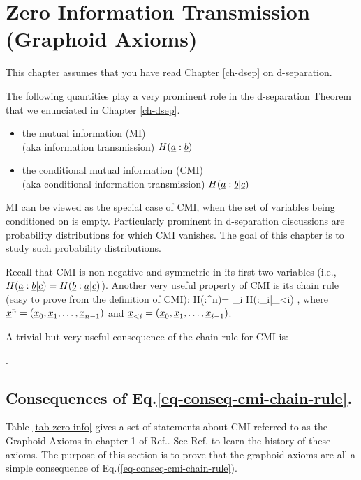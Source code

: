 \chapter{Zero Information Transmission 
(Graphoid Axioms)}

This chapter
assumes that you
have read Chapter \ref{ch-dsep}
on d-separation.


The
following
quantities
play a very prominent
role
in the d-separation Theorem
that we enunciated in Chapter  \ref{ch-dsep}.

\begin{itemize}
\item
the mutual
information (MI)\\
 (aka information transmission) $H({\underline{a}}:{\underline{b}})$
\item
the conditional mutual
information (CMI)\\
(aka conditional
information
transmission) $H({\underline{a}}:{\underline{b}}|{\underline{c}})$
\end{itemize}
MI can be viewed
as the special 
case of CMI,
when the set 
of variables being
conditioned on is empty.
Particularly prominent
in d-separation discussions
are probability
distributions
for which CMI vanishes.
The goal
of this chapter
is to study such 
probability distributions.


Recall that CMI
is non-negative and symmetric
in its first two variables (i.e.,
$H({\underline{a}}:{\underline{b}}|{\underline{c}})=H({\underline{b}}:{\underline{a}}|{\underline{c}})$).
Another very useful
property of CMI
is its chain rule
(easy to prove from the definition of CMI):
\beq
H(\rvy:\rvx^n)=
\sum_i
H(\rvy:\rvx_i|\rvx_{<i})
\;,
\eeq
where ${\underline{x}}^n=({\underline{x}}_0, {\underline{x}}_1, \ldots, {\underline{x}}_{n-1})$
and 
${\underline{x}}_{<i}=({\underline{x}}_0, {\underline{x}}_1, \dots, {\underline{x}}_{i-1})$.

A trivial
but
very useful
consequence
of the chain rule
for CMI is:

\beq{}
\;.
\label{eq-conseq-cmi-chain-rule}
\eeq

\section*{Consequences of 
Eq.\ref{eq-conseq-cmi-chain-rule}.}
Table \ref{tab-zero-info} gives
a set 
of statements about CMI
referred to as  the Graphoid Axioms
in
 chapter 1 
of Ref.\cite{pearl-2013book}. See 
Ref.\cite{pearl-2013book}
to learn
the history of these axioms.
The purpose
of this 
section
is to prove
that the graphoid 
axioms
are all
a simple consequence
of Eq.(\ref{eq-conseq-cmi-chain-rule}).



